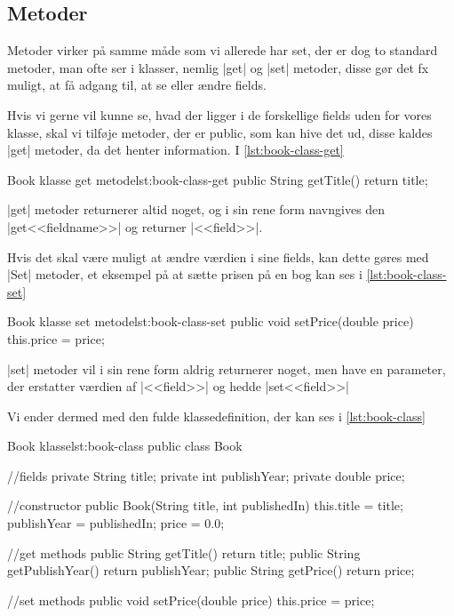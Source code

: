 \subsection{Metoder}

Metoder virker på samme måde som vi allerede har set, der er dog to standard metoder, man ofte ser i klasser, nemlig \JavaInline|get| og \JavaInline|set| metoder, disse gør det fx muligt, at få adgang til, at se eller ændre fields. 

Hvis vi gerne vil kunne se, hvad der ligger i de forskellige fields uden for vores klasse, skal vi tilføje metoder, der er public, som kan hive det ud, disse kaldes \JavaInline|get| metoder, da det henter information. I \autoref{lst:book-class-get}

\begin{JavaCode}{Book klasse get metode}{lst:book-class-get}
	public String getTitle() {
		return title;
	}
\end{JavaCode}

\JavaInline|get| metoder returnerer altid noget, og i sin rene form navngives den \JavaInline|get<<fieldname>>| og returner \JavaInline|<<field>>|.

Hvis det skal være muligt at ændre værdien i sine fields, kan dette gøres med \JavaInline|Set| metoder, et eksempel på at sætte prisen på en bog kan ses i \autoref{lst:book-class-set}

\begin{JavaCode}{Book klasse set metode}{lst:book-class-set}
	public void setPrice(double price) {
		this.price = price;
	}
\end{JavaCode}

\JavaInline|set| metoder vil i sin rene form aldrig returnerer noget, men have en parameter, der erstatter værdien af \JavaInline|<<field>>| og hedde \JavaInline|set<<field>>|

Vi ender dermed med den fulde klassedefinition, der kan ses i \autoref{lst:book-class}

\begin{JavaCode}{Book klasse}{lst:book-class}
	public class Book {
		//fields
		private String title;
		private int publishYear;
		private double price;
		
		//constructor
		public Book(String title, int publishedIn) {
			this.title = title;
			publishYear = publishedIn;
			price = 0.0;
		}
	
		//get methods
		public String getTitle() {
			return title;
		}
		public String getPublishYear() {
			return publishYear;
		}
		public String getPrice() {
			return price;
		}
		
		//set methods
		public void setPrice(double price) {
			this.price = price;
		}
	}
\end{JavaCode}

